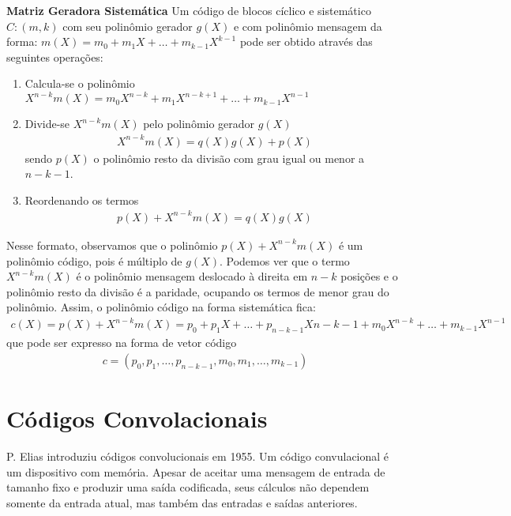 \begin{definition} {\bf Matriz Geradora Sistemática} \label{matgerclic}  Um código de blocos cíclico e sistemático $C:(m,k)$ com seu polinômio gerador $g(X)$ e com polinômio mensagem da forma: $m(X)=m_0+m_1X+ \ldots +m_{k-1}X^{k-1}$ pode ser obtido através das seguintes operações:
\begin{enumerate}
  \item Calcula-se o polinômio $X^{n-k}m(X)=m_0X^{n-k}+m_1X^{n-k+1}+ \ldots +m_{k-1}X^{n-1}$
  \item Divide-se $X^{n-k}m(X)$ pelo polinômio gerador $g(X)$
   \begin{align*}
     X^{n-k}m(X)=q(X)g(X)+p(X)
   \end{align*}
sendo $p(X)$ o polinômio resto da divisão com grau igual ou menor a $n-k-1$.
  \item Reordenando os termos
     \begin{align*}
     p(X)+X^{n-k}m(X)=q(X)g(X)
   \end{align*}
\end{enumerate}
Nesse formato, observamos que o polinômio $p(X)+X^{n-k}m(X)$ é um polinômio código, pois é múltiplo de $g(X)$. Podemos ver que o termo $X^{n-k}m(X)$ é o polinômio mensagem deslocado à direita em $n-k$ posições e o polinômio resto da divisão é a paridade, ocupando os termos de menor grau do polinômio. Assim, o polinômio código na forma sistemática fica:
    \begin{align*}
     c(X)=p(X)+X^{n-k}m(X)=p_0+p_1X+ \ldots +p_{n-k-1}X{n-k-1}+m_0X^{n-k}+ \ldots +m_{k-1}X^{n-1}
    \end{align*}
que pode ser expresso na forma de vetor código
    \begin{align*}
     c=(p_0,p_1, \ldots, p_{n-k-1},m_0,m_1, \ldots, m_{k-1})
    \end{align*}
\end{definition}

\section{Códigos Convolacionais}

P. Elias introduziu códigos convolucionais em 1955. Um código convulacional é um dispositivo com memória. Apesar de aceitar uma mensagem de entrada de tamanho fixo e produzir uma saída codificada, seus cálculos não dependem somente da entrada atual, mas também das entradas e saídas anteriores.

